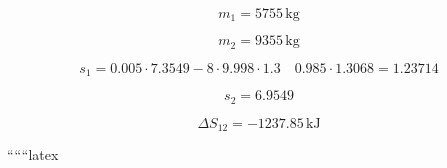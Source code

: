 \begin{equation*}
m_1 = 5755 \, \text{kg}
\end{equation*}

\begin{equation*}
m_2 = 9355 \, \text{kg}
\end{equation*}

\begin{equation*}
s_1 = 0.005 \cdot 7.3549 - 8 \cdot 9.998 \cdot 1.3 \quad 0.985 \cdot 1.3068 = 1.23714
\end{equation*}

\begin{equation*}
s_2 = 6.9549
\end{equation*}

\begin{equation*}
\Delta S_{12} = -1237.85 \, \text{kJ}
\end{equation*}

``````latex